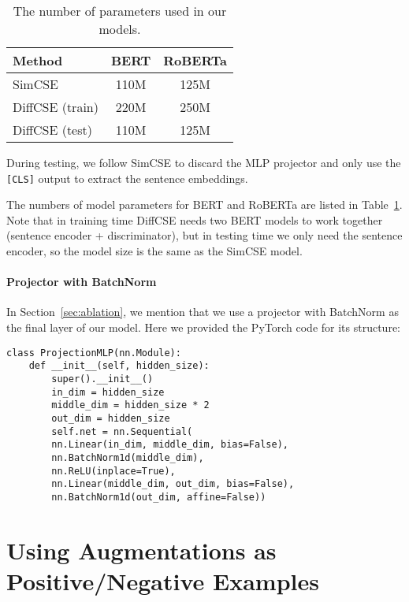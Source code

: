 \documentclass[11pt]{article}
\newcommand{\ba}{\xspace}
\begin{document}
\begin{table}[h!]
\centering
\small
\setlength\tabcolsep{3pt}
\begin{tabular}{lcc}
\toprule
\bf Method & \bf BERT\ba & \bf RoBERTa\ba\\
\midrule
SimCSE & 110M & 125M\\
DiffCSE (train) & 220M & 250M\\
DiffCSE (test) & 110M & 125M\\
\bottomrule
\end{tabular}
\caption{The number of parameters used in our models.}
\label{tab:nparam}
\end{table}

During testing, we follow SimCSE to discard the MLP projector and only use the \texttt{[CLS]} output to extract the sentence embeddings.

The numbers of model parameters for BERT\ba and RoBERTa\ba are listed in Table~\ref{tab:nparam}. Note that in training time DiffCSE needs two BERT models to work together (sentence encoder + discriminator), but in testing time we only need the sentence encoder, so the model size is the same as the SimCSE model.


\paragraph{Projector with BatchNorm}
In Section~\ref{sec:ablation}, we mention that we use a projector with BatchNorm as the final layer of our model. Here we provided the PyTorch code for its structure:
\begin{lstlisting}
class ProjectionMLP(nn.Module):
    def __init__(self, hidden_size): 
        super().__init__()
        in_dim = hidden_size
        middle_dim = hidden_size * 2
        out_dim = hidden_size
        self.net = nn.Sequential(
        nn.Linear(in_dim, middle_dim, bias=False),
        nn.BatchNorm1d(middle_dim),
        nn.ReLU(inplace=True),
        nn.Linear(middle_dim, out_dim, bias=False),
        nn.BatchNorm1d(out_dim, affine=False))
\end{lstlisting}

\section{Using Augmentations as Positive/Negative Examples}
\end{document}
